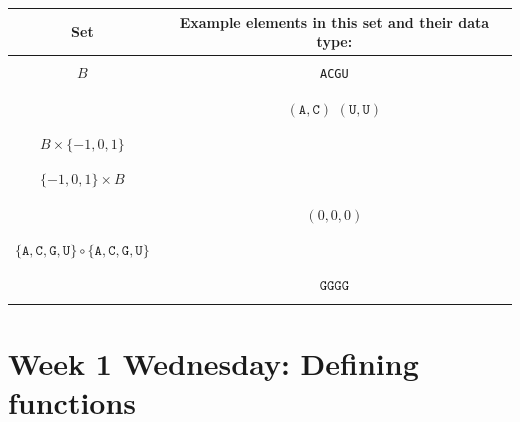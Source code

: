 \documentclass[12pt, oneside]{article}
\newcommand{\A}[0]{\texttt{A}}
\newcommand{\C}[0]{\texttt{C}}
\newcommand{\G}[0]{\texttt{G}}
\newcommand{\U}[0]{\texttt{U}}
\begin{document}
\begin{center}
\begin{tabular}{cc}
{\bf  Set} & {\bf Example elements in this set and their data type}:\\
\hline 
& \\
$B$ &\A \qquad \C \qquad \G \qquad \U \\
& \\
\hline
& \\
\phantom{$B \times B$} & $(\A, \C)$ \qquad $(\U, \U)$\\
& \\
\hline
& \\
$B \times \{-1,0,1\}$ & \\
& \\
\hline
& \\
$\{-1,0,1\} \times B$ & \\
& \\
\hline
& \\
\phantom{$\{-1,0,1\} \times \{-1,0,1\}  \times \{-1,0,1\} $} & \qquad $(0,0,0)$ \\
& \\
\hline
& \\
$ \{\A, \C, \G, \U \} \circ  \{\A, \C, \G, \U \}$& \\
& \\
\hline
& \\
\phantom{$\{G\} \circ \{G\} \circ \{G\}$} & \qquad $\G\G\G\G$ \\
& \\
\hline

\end{tabular}
\end{center}

\vfill 
\section*{Week 1 Wednesday: Defining functions}
\end{document}
